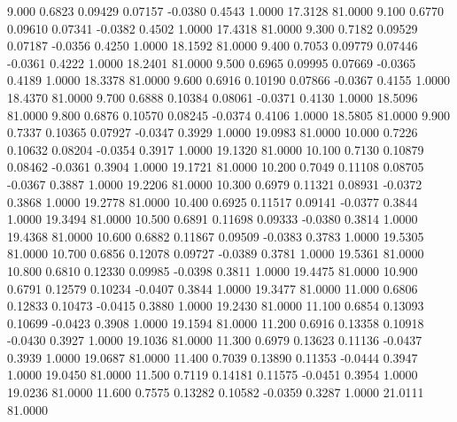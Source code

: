    9.000   0.6823   0.09429   0.07157  -0.0380   0.4543   1.0000  17.3128  81.0000
   9.100   0.6770   0.09610   0.07341  -0.0382   0.4502   1.0000  17.4318  81.0000
   9.300   0.7182   0.09529   0.07187  -0.0356   0.4250   1.0000  18.1592  81.0000
   9.400   0.7053   0.09779   0.07446  -0.0361   0.4222   1.0000  18.2401  81.0000
   9.500   0.6965   0.09995   0.07669  -0.0365   0.4189   1.0000  18.3378  81.0000
   9.600   0.6916   0.10190   0.07866  -0.0367   0.4155   1.0000  18.4370  81.0000
   9.700   0.6888   0.10384   0.08061  -0.0371   0.4130   1.0000  18.5096  81.0000
   9.800   0.6876   0.10570   0.08245  -0.0374   0.4106   1.0000  18.5805  81.0000
   9.900   0.7337   0.10365   0.07927  -0.0347   0.3929   1.0000  19.0983  81.0000
  10.000   0.7226   0.10632   0.08204  -0.0354   0.3917   1.0000  19.1320  81.0000
  10.100   0.7130   0.10879   0.08462  -0.0361   0.3904   1.0000  19.1721  81.0000
  10.200   0.7049   0.11108   0.08705  -0.0367   0.3887   1.0000  19.2206  81.0000
  10.300   0.6979   0.11321   0.08931  -0.0372   0.3868   1.0000  19.2778  81.0000
  10.400   0.6925   0.11517   0.09141  -0.0377   0.3844   1.0000  19.3494  81.0000
  10.500   0.6891   0.11698   0.09333  -0.0380   0.3814   1.0000  19.4368  81.0000
  10.600   0.6882   0.11867   0.09509  -0.0383   0.3783   1.0000  19.5305  81.0000
  10.700   0.6856   0.12078   0.09727  -0.0389   0.3781   1.0000  19.5361  81.0000
  10.800   0.6810   0.12330   0.09985  -0.0398   0.3811   1.0000  19.4475  81.0000
  10.900   0.6791   0.12579   0.10234  -0.0407   0.3844   1.0000  19.3477  81.0000
  11.000   0.6806   0.12833   0.10473  -0.0415   0.3880   1.0000  19.2430  81.0000
  11.100   0.6854   0.13093   0.10699  -0.0423   0.3908   1.0000  19.1594  81.0000
  11.200   0.6916   0.13358   0.10918  -0.0430   0.3927   1.0000  19.1036  81.0000
  11.300   0.6979   0.13623   0.11136  -0.0437   0.3939   1.0000  19.0687  81.0000
  11.400   0.7039   0.13890   0.11353  -0.0444   0.3947   1.0000  19.0450  81.0000
  11.500   0.7119   0.14181   0.11575  -0.0451   0.3954   1.0000  19.0236  81.0000
  11.600   0.7575   0.13282   0.10582  -0.0359   0.3287   1.0000  21.0111  81.0000
